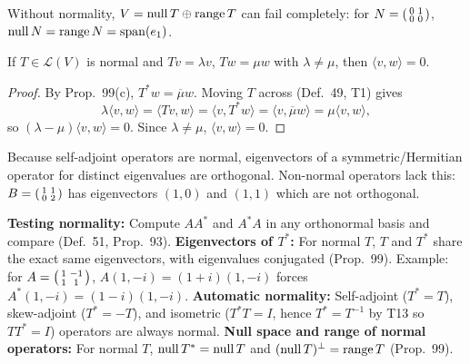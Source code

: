 \documentclass[10pt]{scrartcl}
\newcommand{\LL}{\mathcal L}\newcommand{\PP}{\mathcal P}\newcommand{\MM}{\mathcal M}
\begin{document}
Without normality, $V=\operatorname{null} T\oplus\operatorname{range} T$ can fail completely: for $N=\begin{psmallmatrix}0&1\\0&0\end{psmallmatrix}$, $\operatorname{null} N = \operatorname{range} N = \operatorname{span}(e_1)$.

\begin{proposition*}
  If $T\in\LL(V)$ is normal and $Tv=\lambda v$, $Tw=\mu w$ with $\lambda\neq\mu$, then $\langle v,w\rangle=0$.
\end{proposition*}
\begin{proof}
  By Prop.~99(c), $T^*w=\overline{\mu}w$. Moving $T$ across (Def.~49, T1) gives
  \[
    \lambda\langle v,w\rangle = \langle Tv,w\rangle = \langle v,T^*w\rangle = \langle v,\overline{\mu}w\rangle = \mu\langle v,w\rangle,
  \]
  so $(\lambda-\mu)\langle v,w\rangle=0$. Since $\lambda\neq\mu$, $\langle v,w\rangle=0$.
\end{proof}

Because self-adjoint operators are normal, eigenvectors of a symmetric/Hermitian operator for distinct eigenvalues are orthogonal. Non-normal operators lack this: $B=\begin{psmallmatrix}1&1\\0&2\end{psmallmatrix}$ has eigenvectors $(1,0)$ and $(1,1)$ which are not orthogonal.

\begin{shortcuts}
  \ii \textbf{Testing normality:} Compute $AA^*$ and $A^*A$ in any orthonormal basis and compare (Def.~51, Prop.~93).
  \ii \textbf{Eigenvectors of $T^*$:} For normal $T$, $T$ and $T^*$ share the exact same eigenvectors, with eigenvalues conjugated (Prop.~99). Example: for $A=\begin{psmallmatrix}1&-1\\1&1\end{psmallmatrix}$, $A(1,-i)=(1+i)(1,-i)$ forces $A^*(1,-i)=(1-i)(1,-i)$.
  \ii \textbf{Automatic normality:} Self-adjoint ($T^*=T$), skew-adjoint ($T^*=-T$), and isometric ($T^*T=I$, hence $T^*=T^{-1}$ by T13 so $TT^*=I$) operators are always normal.
  \ii \textbf{Null space and range of normal operators:} For normal $T$, $\operatorname{null} T^*=\operatorname{null} T$ and $(\operatorname{null} T)^\perp=\operatorname{range} T$ (Prop.~99).
\end{shortcuts}
\end{document}
